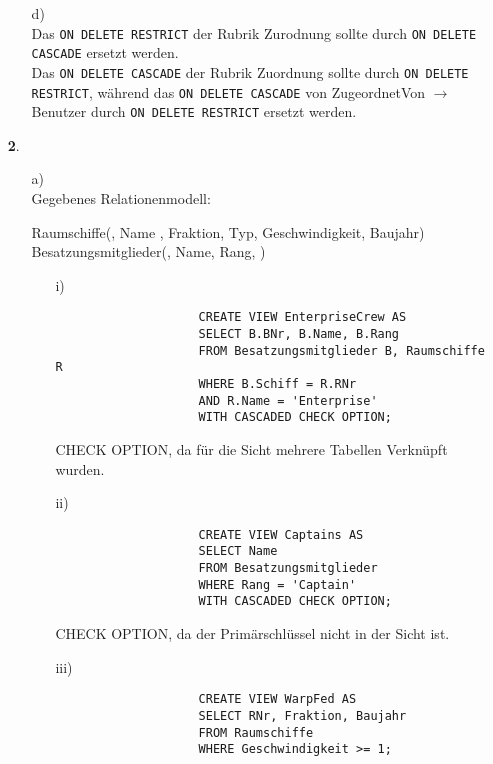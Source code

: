 \documentclass[a4paper,11pt,fleqn]{scrartcl}
\begin{document}
\begin{enumerate}
\begin{enumerate}
			\item[d)] \quad \\
			Das \texttt{ON DELETE RESTRICT} der Rubrik Zurodnung sollte durch \texttt{ON DELETE CASCADE} 
			ersetzt werden. \\
			Das \texttt{ON DELETE CASCADE} der Rubrik Zuordnung sollte durch \texttt{ON DELETE RESTRICT},
			während das \texttt{ON DELETE CASCADE} von ZugeordnetVon \(\rightarrow\) Benutzer durch 
			\texttt{ON DELETE RESTRICT} ersetzt werden.
		\end{enumerate}
	
		\newpage
		\item[\textbf{2}.]
		\begin{enumerate}
			\item[a)] \quad \\
			Gegebenes Relationenmodell: \\
			\begin{RMSchma}
				Raumschiffe(, Name , Fraktion, Typ, Geschwindigkeit, Baujahr)\\
				Besatzungsmitglieder(, Name, Rang, )
			\end{RMSchma}
			
			\begin{enumerate}
				\item[i)]
				\begin{verbatim}
					CREATE VIEW EnterpriseCrew AS
					SELECT B.BNr, B.Name, B.Rang
					FROM Besatzungsmitglieder B, Raumschiffe R
					WHERE B.Schiff = R.RNr
					AND R.Name = 'Enterprise'
					WITH CASCADED CHECK OPTION;
				\end{verbatim}
				CHECK OPTION, da für die Sicht mehrere Tabellen Verknüpft wurden.

				\item[ii)]
				\begin{verbatim}
					CREATE VIEW Captains AS
					SELECT Name
					FROM Besatzungsmitglieder
					WHERE Rang = 'Captain'
					WITH CASCADED CHECK OPTION;
				\end{verbatim}
				CHECK OPTION, da der Primärschlüssel nicht in der Sicht ist.

				\item[iii)]
				\begin{verbatim}
					CREATE VIEW WarpFed AS
					SELECT RNr, Fraktion, Baujahr
					FROM Raumschiffe
					WHERE Geschwindigkeit >= 1;
				\end{verbatim}
			\end{enumerate}
		


\end{enumerate}
\end{enumerate}
\end{document}
